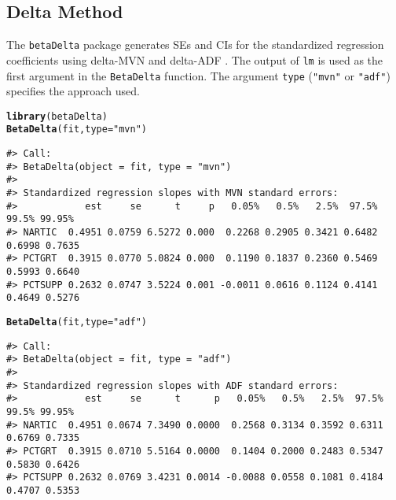 \documentclass[man]{apa7}\usepackage[]{graphicx}\usepackage[]{xcolor}
\makeatletter
\newcommand{\hlstr}[1]{\textcolor[rgb]{0.192,0.494,0.8}{#1}}%
\newcommand{\hlstd}[1]{\textcolor[rgb]{0.345,0.345,0.345}{#1}}%
\newcommand{\hlkwc}[1]{\textcolor[rgb]{0.333,0.667,0.333}{#1}}%
\newcommand{\hlkwd}[1]{\textcolor[rgb]{0.737,0.353,0.396}{\textbf{#1}}}%
\newenvironment{kframe}{%
 \def\at@end@of@kframe{}%
 \ifinner\ifhmode%
  \def\at@end@of@kframe{\end{minipage}}%
  \begin{minipage}{\columnwidth}%
 \fi\fi%
 \def\FrameCommand##1{\hskip\@totalleftmargin \hskip-\fboxsep
 \colorbox{shadecolor}{##1}\hskip-\fboxsep
     \hskip-\linewidth \hskip-\@totalleftmargin \hskip\columnwidth}%
 \MakeFramed {\advance\hsize-\width
   \@totalleftmargin\z@ \linewidth\hsize
   \@setminipage}}%
 {\par\unskip\endMakeFramed%
 \at@end@of@kframe}
\newenvironment{knitrout}{}{} %
\makeatother
\begin{document}
\subsection{Delta Method}

The \texttt{betaDelta} package
generates SEs and CIs
for the standardized regression coefficients
using delta-MVN
\parencite{Lib-Regression-Standardized-Coefficients-Delta-Yuan-2011}
and
delta-ADF
\parencite{Lib-Regression-Standardized-Coefficients-Delta-Jones-2015}.
The output of \texttt{lm}
is used as the first argument in the  \texttt{BetaDelta} function.
The argument \texttt{type} (\texttt{"mvn"} or \texttt{"adf"})
specifies the approach used.

\vspace{-.5em}
\begin{minipage}{.75\linewidth}
	\singlespacing
\begin{knitrout}\scriptsize
{}\color{fgcolor}\begin{kframe}
\begin{alltt}
\hlkwd{library}\hlstd{(betaDelta)}
\hlkwd{BetaDelta}\hlstd{(fit,} \hlkwc{type} \hlstd{=} \hlstr{"mvn"}\hlstd{)}
\end{alltt}
\begin{verbatim}
#> Call:
#> BetaDelta(object = fit, type = "mvn")
#> 
#> Standardized regression slopes with MVN standard errors:
#>            est     se      t     p   0.05%   0.5%   2.5%  97.5%  99.5% 99.95%
#> NARTIC  0.4951 0.0759 6.5272 0.000  0.2268 0.2905 0.3421 0.6482 0.6998 0.7635
#> PCTGRT  0.3915 0.0770 5.0824 0.000  0.1190 0.1837 0.2360 0.5469 0.5993 0.6640
#> PCTSUPP 0.2632 0.0747 3.5224 0.001 -0.0011 0.0616 0.1124 0.4141 0.4649 0.5276
\end{verbatim}
\begin{alltt}
\hlkwd{BetaDelta}\hlstd{(fit,} \hlkwc{type} \hlstd{=} \hlstr{"adf"}\hlstd{)}
\end{alltt}
\begin{verbatim}
#> Call:
#> BetaDelta(object = fit, type = "adf")
#> 
#> Standardized regression slopes with ADF standard errors:
#>            est     se      t      p   0.05%   0.5%   2.5%  97.5%  99.5% 99.95%
#> NARTIC  0.4951 0.0674 7.3490 0.0000  0.2568 0.3134 0.3592 0.6311 0.6769 0.7335
#> PCTGRT  0.3915 0.0710 5.5164 0.0000  0.1404 0.2000 0.2483 0.5347 0.5830 0.6426
#> PCTSUPP 0.2632 0.0769 3.4231 0.0014 -0.0088 0.0558 0.1081 0.4184 0.4707 0.5353
\end{verbatim}
\end{kframe}
\end{knitrout}
\end{minipage}
\end{document}
